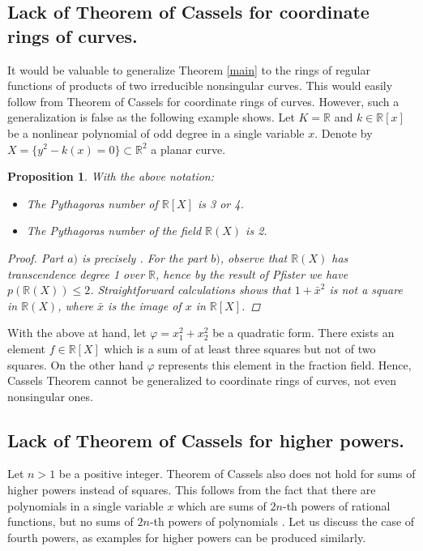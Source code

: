 \documentclass[12pt,reqno]{amsart}   	%
\newtheorem{prop}[thm]{Proposition}
\theoremstyle{obs}
\theoremstyle{prob}
\theoremstyle{conj}
\theoremstyle{remark}
\newcommand{\R}{\mathbb{R}}
\begin{document}
\subsection{Lack of Theorem of Cassels for coordinate rings of curves.}
It would be valuable to generalize Theorem \ref{main} to the rings of regular functions of products of two irreducible nonsingular curves. This would easily follow from Theorem of Cassels for coordinate rings of curves. However, such a generalization is false as the following example shows. Let $K=\mathbb{R}$ and $k \in \mathbb{R}[x]$ be a nonlinear polynomial of odd degree in a single variable $x$. Denote by $X=\{y^2-k(x)=0 \} \subset \R^2$ a  planar curve.

\begin{prop}
With the above notation:
\begin{itemize}
\item[a)] The Pythagoras number of $\R[X]$ is 3 or 4.
\item[b)] The Pythagoras number of the field $\R(X)$ is 2.

\end{itemize}

\begin{proof}
Part $a)$ is precisely \cite[Proposition 3.8]{cldr1982}. For the part $b)$, observe that $\R(X)$ has transcendence degree 1 over $\R$, hence by the result of Pfister \cite[Corollary 3.4]{pfister1995} we have $p(\R(X))\leq 2$. Straightforward calculations shows that $1+\bar{x}^2$ is not a square in $\R(X)$, where $\bar{x}$ is the image of $x$ in $\mathbb{R}[X]$.

\end{proof}
\end{prop}

With the above at hand, let $\varphi = x_1^2+x_2^2$ be a quadratic form. There exists an element $f\in \R[X]$ which is a sum of at least three squares but not of two squares. On the other hand $\varphi$ represents this element in the fraction field. Hence, Cassels Theorem cannot be generalized to coordinate rings of curves, not even nonsingular ones.

\subsection{Lack of Theorem of Cassels for higher powers.}
Let $n>1$ be a positive integer. Theorem of Cassels also does not hold for sums of higher powers instead of squares. This follows from the fact that there are polynomials in a single variable $x$ which are sums of $2n$-th powers of rational functions, but no sums of $2n$-th powers of polynomials \cite{prestel1984}. Let us discuss the case of fourth powers, as examples for higher powers can be produced similarly. 
\end{document}
